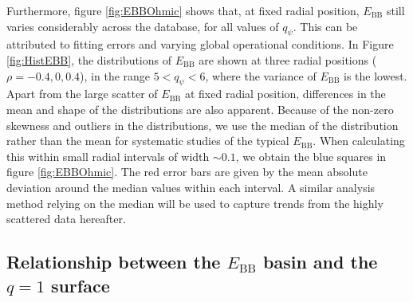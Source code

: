 Furthermore, figure \ref{fig:EBBOhmic} shows that, at fixed radial position, $E_\mathrm{BB}$ still varies considerably across the database, for all values of $q_{\psi}$. This can be attributed to fitting errors and varying global operational conditions. In Figure \ref{fig:HistEBB}, the distributions of $E_\mathrm{BB}$ are shown at three radial positions ($\rho = -0.4, 0, 0.4$), in the range $5 < q_{\psi} < 6$, where the variance of $E_\mathrm{BB}$ is the lowest. Apart from the large scatter of $E_\mathrm{BB}$ at fixed radial position, differences in the mean and shape of the distributions are also apparent. Because of the non-zero skewness and outliers in the distributions, we use the median of the distribution rather than the mean for systematic studies of the typical $E_\mathrm{BB}$. When calculating this within small radial intervals of width $\sim 0.1$, we obtain the blue squares in figure \ref{fig:EBBOhmic}. The red error bars are given by the mean absolute deviation around the median values within each interval. A similar analysis method relying on the median will be used to capture trends from the highly scattered data hereafter.


\subsection{Relationship between the $E_\mathrm{BB}$ basin and the $q = 1$ surface}

